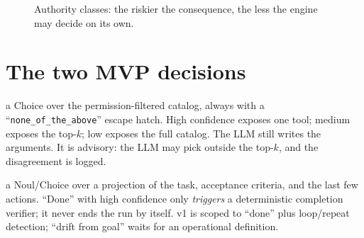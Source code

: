 \begin{figure}[h]\centering
{}
\caption{Authority classes: the riskier the consequence, the less the engine may decide on
its own.}
\label{fig:authority}
\end{figure}

\section{The two MVP decisions}

\begin{description}[leftmargin=1.4cm,style=nextline]
  \item[DP2 tool pre-selection] a Choice over the permission-filtered catalog, always with a
    ``\texttt{none\_of\_the\_above}'' escape hatch. High confidence exposes one tool; medium
    exposes the top-$k$; low exposes the full catalog. The LLM still writes the arguments. It
    is advisory: the LLM may pick outside the top-$k$, and the disagreement is logged.
  \item[DP4 done / stuck] a Noul/Choice over a projection of the task, acceptance criteria,
    and the last few actions. ``Done'' with high confidence only \emph{triggers} a
    deterministic completion verifier; it never ends the run by itself. v1 is scoped to
    ``done'' plus loop/repeat detection; ``drift from goal'' waits for an operational
    definition.
\end{description}

